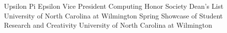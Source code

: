 

\begin{cvhonorsTwo}

  \cvhonorTwo
    {Upsilon Pi Epsilon Vice President}
    {Computing Honor Society}
  \cvhonorTwo
    {Dean's List}
    {University of North Carolina at Wilmington}
  \cvhonorTwo
    {Spring Showcase of Student Research and Creativity}
    {University of North Carolina at Wilmington}
\end{cvhonorsTwo}
